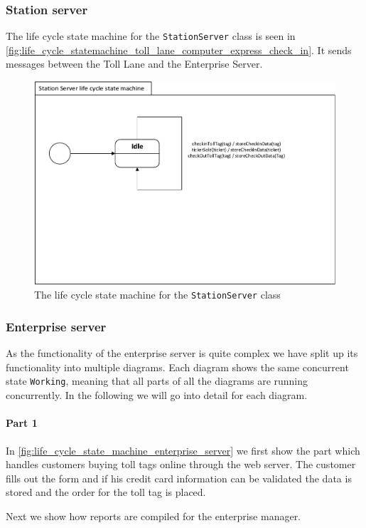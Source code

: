 \subsubsection*{Station server}
The life cycle state machine for the \texttt{StationServer} class is seen in \autoref{fig:life_cycle_statemachine_toll_lane_computer_express_check_in}. It sends messages between the Toll Lane and the Enterprise Server.
\begin{figure}[H]
\centering
\includegraphics[width=0.7\linewidth]{img/behaviour_state_machines/life_cycle_state_machines/life_cycle_state_machine_station_server}
\caption{The life cycle state machine for the \texttt{StationServer} class}
\label{fig:life_cycle_state_machine_station_server}
\end{figure}


\subsubsection*{Enterprise server}
As the functionality of the enterprise server is quite complex we have split up its functionality into multiple diagrams. Each diagram shows the same concurrent state \texttt{Working}, meaning that all parts of all the diagrams are running concurrently. In the following we will go into detail for each diagram.

\paragraph*{Part 1} In \autoref{fig:life_cycle_state_machine_enterprise_server} we first show the part which handles customers buying toll tags online through the web server. The customer fills out the form and if his credit card information can be validated the data is stored and the order for the toll tag is placed.

Next we show how reports are compiled for the enterprise manager.

